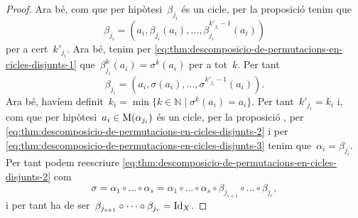 \documentclass[../../main.tex]{subfiles}
\begin{document}
\begin{proof}
        Ara bé, com que per hipòtesi~\(\beta_{j_{i}}\) és un cicle, per la proposició  tenim que
        \[
            \beta_{j_{i}}=\left(a_{i},\beta_{j_{i}}(a_{i}),\dots,\beta^{k'_{j_{i}}-1}_{j_{i}}(a_{i})\right)
        \]
        per a cert~\(k'_{j_{i}}\).
        Ara bé, tenim per \eqref{eq:thm:descomposicio-de-permutacions-en-cicles-disjunts-1} que~\(\beta^{k}_{j_{i}}(a_{i})=\sigma^{k}(a_{i})\) per a tot~\(k\).
        Per tant
        \[
            \beta_{j_{i}}=\left(a_{i},\sigma(a_{i}),\dots,\sigma^{k'_{j_{i}}-1}(a_{i})\right).
        \]
        Ara bé, havíem definit~\(k_{i}=\min\{k\in\mathbb{N}\mid\sigma^{k}(a_{i})=a_{i}\}\).
        Per tant~\(k'_{j_{i}}=k_{i}\) i, com que per hipòtesi~\(a_{i}\in\operatorname{M}(\alpha_{j_{i}})\) és un cicle, per la proposició , per \eqref{eq:thm:descomposicio-de-permutacions-en-cicles-disjunts-2} i per \eqref{eq:thm:descomposicio-de-permutacions-en-cicles-disjunts-3} tenim que~\(\alpha_{i}=\beta_{j_{i}}\).
        Per tant podem reescriure \eqref{eq:thm:descomposicio-de-permutacions-en-cicles-disjunts-2} com
        \[
            \sigma=\alpha_{1}\circ\dots\circ\alpha_{s}=\alpha_{1}\circ\dots\circ\alpha_{s}\circ\beta_{j_{s+1}}\circ\dots\circ\beta_{j_{r}},
        \]
        i per tant ha de ser~\(\beta_{j_{s+1}}\circ\dots\circ\beta_{j_{r}}=\operatorname{Id}_{X}\).
    \end{proof}
\end{document}
